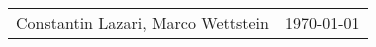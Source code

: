 \documentclass[12pt, a4paper, answers]{exam} %
\newcommand{\myAuthor}{Constantin Lazari, Marco Wettstein}
\begin{document}
	\begin{tabularx}{\textwidth}{Xr}
	\myAuthor & \today\\
	\end{tabularx}
	\begin{questions}
	
	
	
	
	
	\end{questions}
\end{document}
